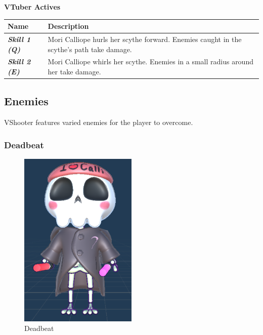 \documentclass[10pt, a4paper]{article}
\begin{document}
	\begin{center}
		\textbf{VTuber Actives}
	\end{center}
	\begin{center}
		\begin{supertabular}{|p{2.7cm}|p{6cm}|}
			\hline
			\textbf{Name} & \textbf{Description} \\
			\hline
			\textit{\textbf{Skill 1 (Q)}} & Mori Calliope hurls her scythe forward. Enemies caught in the scythe's path take damage. \\
			\textit{\textbf{Skill 2 (E)}} & Mori Calliope whirls her scythe. Enemies in a small radius around her take damage. \\
			\hline
		\end{supertabular}
	\end{center}
  	
  	\subsection{Enemies} \label{Enemies}

	VShooter features varied enemies for the player to overcome.

	\subsubsection{Deadbeat}

	\begin{figure}[H]
		\centering
		\includegraphics[width=0.5\textwidth]{images/deadbeat1.png}
		\caption{Deadbeat}
		\label{fig:deadbeat}
	\end{figure}
	
\end{document}
